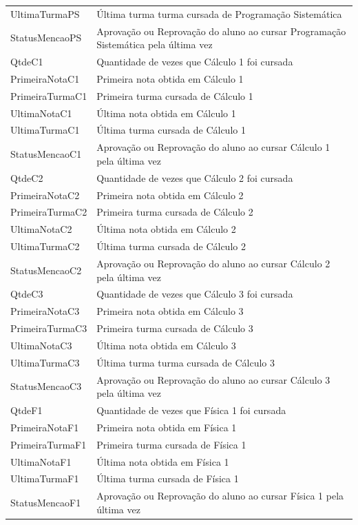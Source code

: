 \begin{longtable}{C{4cm}|C{12cm}}
		UltimaTurmaPS & Última turma turma cursada de Programação 
		Sistemática\\
		StatusMencaoPS & Aprovação ou Reprovação do aluno ao cursar Programação Sistemática pela última vez\\
		QtdeC1 & Quantidade de vezes que Cálculo 1 foi cursada\\
		PrimeiraNotaC1 & Primeira nota obtida em Cálculo 1\\
		PrimeiraTurmaC1 & Primeira turma cursada de Cálculo 1\\
		UltimaNotaC1 & Última nota obtida em Cálculo 1\\
		UltimaTurmaC1 & Última turma cursada de Cálculo 1\\
		StatusMencaoC1 & Aprovação ou Reprovação do aluno ao cursar Cálculo 1 pela última vez\\
		QtdeC2 & Quantidade de vezes que Cálculo 2 foi cursada\\
		PrimeiraNotaC2 & Primeira nota obtida em Cálculo 2\\
		PrimeiraTurmaC2 & Primeira turma cursada de Cálculo 2\\
		UltimaNotaC2 & Última nota obtida em Cálculo 2\\
		UltimaTurmaC2 & Última turma cursada de Cálculo 2\\
		StatusMencaoC2 & Aprovação ou Reprovação do aluno ao cursar Cálculo 2 pela última vez\\
		QtdeC3 & Quantidade de vezes que Cálculo 3 foi cursada\\
		PrimeiraNotaC3 & Primeira nota obtida em Cálculo 3\\
		PrimeiraTurmaC3 & Primeira turma cursada de Cálculo 3\\
		UltimaNotaC3 & Última nota obtida em Cálculo 3\\
		UltimaTurmaC3 & Última turma turma cursada de Cálculo 3\\
		StatusMencaoC3 & Aprovação ou Reprovação do aluno ao cursar Cálculo 3 pela última vez\\
		QtdeF1 & Quantidade de vezes que Física 1 foi cursada\\
		PrimeiraNotaF1 & Primeira nota obtida em Física 1\\
		PrimeiraTurmaF1 & Primeira turma cursada de Física 1\\
		UltimaNotaF1 & Última nota obtida em Física 1\\
		UltimaTurmaF1 & Última turma cursada de Física 1\\
		StatusMencaoF1 & Aprovação ou Reprovação do aluno ao cursar Física 1 pela última vez\\

\end{longtable}
